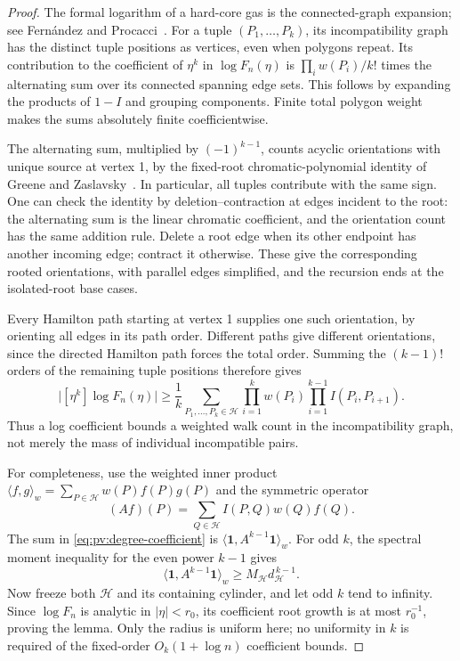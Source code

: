 \begin{proof}
The formal logarithm of a hard-core gas is the connected-graph expansion;
see Fern\'andez and Procacci~\cite[Eqs.~(2.2)--(2.4)]{FernandezProcacci2007}.
For a tuple \((P_1,\ldots,P_k)\), its incompatibility graph has the distinct
tuple positions as vertices, even when polygons repeat. Its contribution to
the coefficient of \(\eta^k\) in \(\log F_n(\eta)\) is
\(\prod_iw(P_i)/k!\) times the alternating sum over its connected spanning
edge sets. This follows by expanding the products of \(1-I\) and grouping
components. Finite total polygon weight makes the sums absolutely finite
coefficientwise.

The alternating sum, multiplied by \((-1)^{k-1}\), counts acyclic
orientations with unique source at vertex 1, by the fixed-root
chromatic-polynomial identity of Greene and
Zaslavsky~\cite[Theorem~7.3]{GreeneZaslavsky1983}. In particular, all tuples
contribute with the same sign. One can check the identity by
deletion--contraction at edges incident to the root: the alternating sum is
the linear chromatic coefficient, and the orientation count has the same
addition rule. Delete a root edge when its other endpoint has another
incoming edge; contract it otherwise. These give the corresponding rooted
orientations, with parallel edges simplified, and the recursion ends at the
isolated-root base cases.

Every Hamilton path starting at vertex 1 supplies one such orientation, by
orienting all edges in its path order. Different paths give different
orientations, since the directed Hamilton path forces the total order.
Summing the \((k-1)!\) orders of the remaining tuple positions therefore gives
\begin{equation}\label{eq:pv:degree-coefficient}
 \bigl|[\eta^k]\log F_n(\eta)\bigr|
 \ge \frac1k
 \sum_{P_1,\ldots,P_k\in\mathcal H}
 \prod_{i=1}^k w(P_i)
 \prod_{i=1}^{k-1}I(P_i,P_{i+1}).
\end{equation}
Thus a log coefficient bounds a weighted walk count in the incompatibility
graph, not merely the mass of individual incompatible pairs.

For completeness, use the weighted inner product
\(\langle f,g\rangle_w=\sum_{P\in\mathcal H}w(P)f(P)g(P)\) and the symmetric
operator
\[
 (Af)(P)=\sum_{Q\in\mathcal H}I(P,Q)w(Q)f(Q).
\]
The sum in \eqref{eq:pv:degree-coefficient} is
\(\langle\mathbf1,A^{k-1}\mathbf1\rangle_w\). For odd \(k\), the spectral
moment inequality for the even power \(k-1\) gives
\[
 \langle\mathbf1,A^{k-1}\mathbf1\rangle_w
 \ge M_{\mathcal H}d_{\mathcal H}^{\,k-1}.
\]
Now freeze both \(\mathcal H\) and its containing cylinder, and let odd
\(k\) tend to infinity. Since \(\log F_n\) is analytic in \(|\eta|<r_0\),
its coefficient root growth is at most \(r_0^{-1}\), proving the lemma.
Only the radius is uniform here; no uniformity in \(k\) is required of the
fixed-order \(O_k(1+\log n)\) coefficient bounds.
\end{proof}

